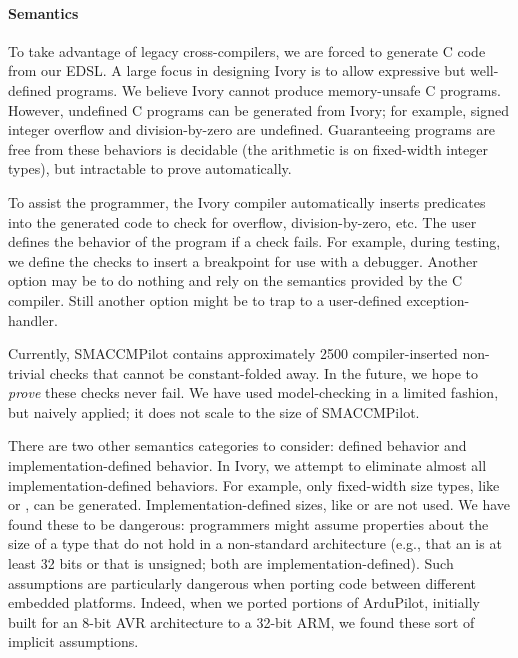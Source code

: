 
\paragraph{Semantics}
To take advantage of legacy cross-compilers, we are forced to
generate C code from our EDSL.  A large focus in designing Ivory is to allow
expressive but well-defined programs.  We believe Ivory
cannot produce memory-unsafe C programs.  However, undefined C programs can be
generated from Ivory; for example, signed integer overflow and division-by-zero
are undefined.  Guaranteeing programs are free from these behaviors is decidable
(the arithmetic is on fixed-width integer types), but intractable to prove
automatically.

To assist the programmer, the Ivory compiler automatically inserts predicates
into the generated code to check for overflow, division-by-zero, etc.  The user
defines the behavior of the program if a check fails.  For example, during
testing, we define the checks to insert a breakpoint for use with a debugger.
Another option may be to do nothing and rely on the semantics provided by the C
compiler.  Still another option might be to trap to a user-defined
exception-handler.

Currently, SMACCMPilot contains approximately 2500 compiler-inserted non-trivial
checks that cannot be constant-folded away.  In the future, we hope to
\emph{prove} these checks never fail.  We have used model-checking in a limited
fashion, but naively applied; it does not scale to the size of SMACCMPilot.

There are two other semantics categories to consider: defined behavior and
implementation-defined behavior.  In Ivory, we attempt to eliminate almost all
implementation-defined behaviors.  For example, only fixed-width size types,
like  or , can be generated.  Implementation-defined
sizes, like  or  are not used.  We have found these to be
dangerous: programmers might assume properties about the size of a type that do not
hold in a non-standard architecture (e.g., that an  is at least 32 bits
or that  is unsigned; both are implementation-defined).  Such
assumptions are particularly dangerous when porting code between different
embedded platforms.  Indeed, when we ported portions of ArduPilot, initially built
for an 8-bit AVR architecture to a 32-bit ARM, we found these sort of implicit
assumptions.

